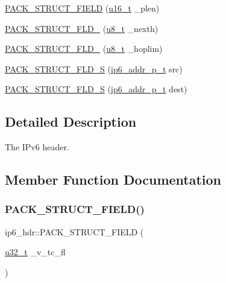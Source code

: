 \begin{DoxyCompactItemize}
\item 
\hyperlink{structip6__hdr_a4d64e25829aa166cbec217bcfe82738d}{P\+A\+C\+K\+\_\+\+S\+T\+R\+U\+C\+T\+\_\+\+F\+I\+E\+LD} (\hyperlink{group__compiler__abstraction_ga77570ac4fcab86864fa1916e55676da2}{u16\+\_\+t} \+\_\+plen)
\item 
\hyperlink{structip6__hdr_a7e8821e0eb16fe1f048228c119a69942}{P\+A\+C\+K\+\_\+\+S\+T\+R\+U\+C\+T\+\_\+\+F\+L\+D\+\_} (\hyperlink{group__compiler__abstraction_ga4caecabca98b43919dd11be1c0d4cd8e}{u8\+\_\+t} \+\_\+nexth)
\item 
\hyperlink{structip6__hdr_ac7897fc50f21b379fd95b4acf8e4e7fb}{P\+A\+C\+K\+\_\+\+S\+T\+R\+U\+C\+T\+\_\+\+F\+L\+D\+\_} (\hyperlink{group__compiler__abstraction_ga4caecabca98b43919dd11be1c0d4cd8e}{u8\+\_\+t} \+\_\+hoplim)
\item 
\hyperlink{structip6__hdr_a5a575c55ef0ba5454a4b2930cfc10733}{P\+A\+C\+K\+\_\+\+S\+T\+R\+U\+C\+T\+\_\+\+F\+L\+D\+\_\+S} (\hyperlink{native_2lwip_2src_2include_2lwip_2prot_2ip6_8h_a560932a657f17ec5a0a3a78a1ce7e60a}{ip6\+\_\+addr\+\_\+p\+\_\+t} src)
\item 
\hyperlink{structip6__hdr_a811301a2309cec8d73a5d79fb5d45578}{P\+A\+C\+K\+\_\+\+S\+T\+R\+U\+C\+T\+\_\+\+F\+L\+D\+\_\+S} (\hyperlink{native_2lwip_2src_2include_2lwip_2prot_2ip6_8h_a560932a657f17ec5a0a3a78a1ce7e60a}{ip6\+\_\+addr\+\_\+p\+\_\+t} dest)
\end{DoxyCompactItemize}


\subsection{Detailed Description}
The I\+Pv6 header. 

\subsection{Member Function Documentation}
\mbox{\label{structip6__hdr_ac6e6140bc60cc977c547fe1edf51bc66}} 
\subsubsection{\texorpdfstring{P\+A\+C\+K\+\_\+\+S\+T\+R\+U\+C\+T\+\_\+\+F\+I\+E\+L\+D()}{PACK\_STRUCT\_FIELD()}\hspace{0.1cm}{\footnotesize\ttfamily [1/4]}}
{\footnotesize\ttfamily ip6\+\_\+hdr\+::\+P\+A\+C\+K\+\_\+\+S\+T\+R\+U\+C\+T\+\_\+\+F\+I\+E\+LD (\begin{DoxyParamCaption}\item[{\hyperlink{group__compiler__abstraction_ga4c14294869aceba3ef9d4c0c302d0f33}{u32\+\_\+t}}]{\+\_\+v\+\_\+tc\+\_\+fl }\end{DoxyParamCaption})}

